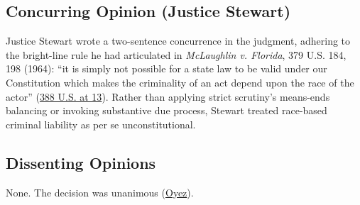 \documentclass[12pt]{article}
\begin{document}
\subsection{Concurring Opinion (Justice Stewart)}
Justice Stewart wrote a two-sentence concurrence in the judgment, adhering to the bright-line rule he had articulated in \textit{McLaughlin v. Florida}, 379 U.S. 184, 198 (1964): ``it is simply not possible for a state law to be valid under our Constitution which makes the criminality of an act depend upon the race of the actor'' (\href{https://supreme.justia.com/cases/federal/us/388/1/}{388 U.S. at 13}). Rather than applying strict scrutiny's means-ends balancing or invoking substantive due process, Stewart treated race-based criminal liability as per se unconstitutional.

\subsection{Dissenting Opinions}
None. The decision was unanimous (\href{https://www.oyez.org/cases/1966/395}{Oyez}).
\end{document}
